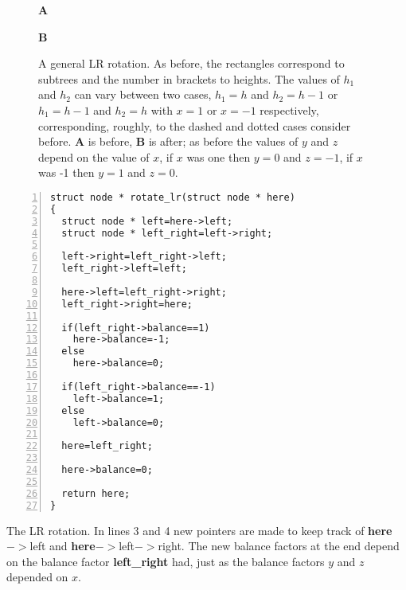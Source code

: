 \documentclass[11pt,a4paper]{scrartcl}
\begin{document}
\begin{figure}
\textbf{A}
\begin{center}
\end{center}
\textbf{B}
\begin{center}
\end{center}
\caption{A general LR rotation. As before, the rectangles correspond
  to subtrees and the number in brackets to heights. The values of
  $h_1$ and $h_2$ can vary between two cases, $h_1=h$ and $h_2=h-1$ or
  $h_1=h-1$ and $h_2=h$ with $x=1$ or $x=-1$ respectively,
  corresponding, roughly, to the dashed and dotted cases consider
  before. \textbf{A} is before, \textbf{B} is after; as before the values of
  $y$ and $z$ depend on the value of $x$, if $x$ was one then $y=0$
  and $z=-1$, if $x$ was -1 then $y=1$ and $z=0$.
\label{fig_LR_complicated}}
\end{figure}




\begin{table}
\begin{lstlisting}[numbers=left]
struct node * rotate_lr(struct node * here)
{
  struct node * left=here->left;
  struct node * left_right=left->right;

  left->right=left_right->left;
  left_right->left=left;

  here->left=left_right->right;
  left_right->right=here;
		  
  if(left_right->balance==1)
    here->balance=-1;
  else
    here->balance=0;
  
  if(left_right->balance==-1)
    left->balance=1;
  else
    left->balance=0;
		  
  here=left_right;
  
  here->balance=0;
  
  return here;
}
\end{lstlisting}
\caption{The LR rotation. In lines 3 and 4 new pointers are made to
  keep track of \textbf{here}$->$left and \textbf{
    here}$->$left$->$right. The new balance factors at the end depend
  on the balance factor \textbf{left\_right} had, just as the balance
  factors $y$ and $z$ depended on $x$.\label{c_LR}}
\end{table}
\end{document}
